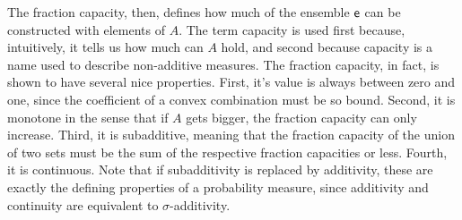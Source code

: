 The fraction capacity, then, defines how much of the ensemble $\mathsf{e}$ can be constructed with elements of $A$. The term capacity is used first because, intuitively, it tells us how much can $A$ hold, and second because capacity is a name used to describe non-additive measures. The fraction capacity, in fact, is shown to have several nice properties. First, it's value is always between zero and one, since the coefficient of a convex combination must be so bound. Second, it is monotone in the sense that if $A$ gets bigger, the fraction capacity can only increase. Third, it is subadditive, meaning that the fraction capacity of the union of two sets must be the sum of the respective fraction capacities or less. Fourth, it is continuous. Note that if subadditivity is replaced by additivity, these are exactly the defining properties of a probability measure, since additivity and continuity are equivalent to $\sigma$-additivity.

